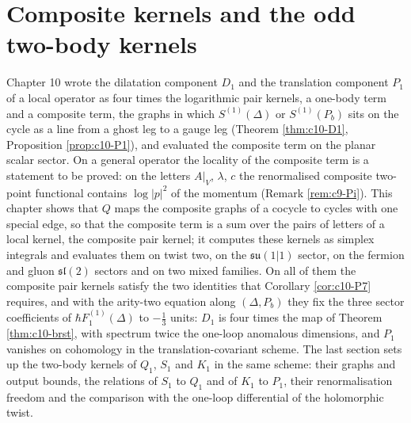 \chapter{Composite kernels and the odd two-body kernels}

Chapter 10 wrote the dilatation component $D_1$ and the translation component $P_1$ of a local operator as four times the logarithmic pair kernels, a one-body term and a composite term, the graphs in which $S^{(1)}(\Delta)$ or $S^{(1)}(P_b)$ sits on the cycle as a line from a ghost leg to a gauge leg (Theorem \ref{thm:c10-D1}, Proposition \ref{prop:c10-P1}), and evaluated the composite term on the planar scalar sector. On a general operator the locality of the composite term is a statement to be proved: on the letters $A|_V$, $\lambda$, $c$ the renormalised composite two-point functional contains $\log|p|^2$ of the momentum (Remark \ref{rem:c9-Pi}). This chapter shows that $Q$ maps the composite graphs of a cocycle to cycles with one special edge, so that the composite term is a sum over the pairs of letters of a local kernel, the composite pair kernel; it computes these kernels as simplex integrals and evaluates them on twist two, on the $\mathfrak{su}(1|1)$ sector, on the fermion and gluon $\mathfrak{sl}(2)$ sectors and on two mixed families. On all of them the composite pair kernels satisfy the two identities that Corollary \ref{cor:c10-P7} requires, and with the arity-two equation along $(\Delta,P_b)$ they fix the three sector coefficients of $\hbar F_1^{(1)}(\Delta)$ to $-\tfrac13$ units: $D_1$ is four times the map of Theorem \ref{thm:c10-brst}, with spectrum twice the one-loop anomalous dimensions, and $P_1$ vanishes on cohomology in the translation-covariant scheme. The last section sets up the two-body kernels of $Q_1$, $S_1$ and $K_1$ in the same scheme: their graphs and output bounds, the relations of $S_1$ to $Q_1$ and of $K_1$ to $P_1$, their renormalisation freedom and the comparison with the one-loop differential of the holomorphic twist.

